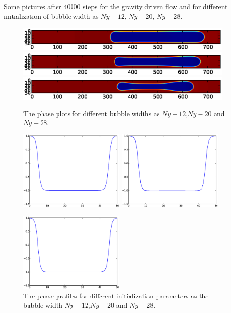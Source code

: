 \documentclass{article}
\begin{document}
Some pictures after $40000$ steps for the gravity driven flow and for different
initialization of bubble width as $Ny-12$, $Ny-20$, $Ny-28$.
\begin{figure}
\includegraphics*[bb=18 350 594 450,width=0.97\textwidth]
{Figures/force_width_6.eps}
\includegraphics*[bb=18 350 594 450,
width=0.97\textwidth]{Figures/force_width_10.eps}
\includegraphics*[bb=18 350 594 450,
width=0.97\textwidth]{Figures/force_width_14.eps}
\caption{The phase plots for different bubble widths as $Ny-12$,$Ny-20$ and
$Ny-28$.}
\end{figure}
\begin{figure}
\includegraphics[width=0.47\textwidth]{Figures/plane_force_width_6.eps}
\includegraphics[width=0.47\textwidth]{Figures/plane_force_width_10.eps}
\begin{center}
\includegraphics[width=0.47\textwidth]{Figures/plane_force_width_14.eps}
\end{center}
\caption{The phase profiles for different initialization parameters as the
bubble width $Ny-12$,$Ny-20$ and $Ny-28$.
\label{fig:phase:profiles:different:widths:force}}
\end{figure}
\end{document}
